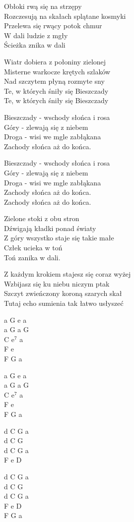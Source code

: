 \begin{text}
    Obłoki rwą się na strzępy\\
    Rozczesują na skałach splątane kosmyki\\
    Przelewa się rwący potok chmur\\
    W dali ludzie z mgły\\
    Ścieżka znika w dali

    Wiatr dobiera z połoniny zielonej\\
    Misterne warkocze krętych szlaków\\
    Nad szczytem płyną rozmyte sny\\
    Te, w których śniły się Bieszczady\\
    Te, w których śniły się Bieszczady

    Bieszczady - wschody słońca i rosa\\
    Góry - zlewają się z niebem\\
    Droga - wisi we mgle zabłąkana\\
    Zachody słońca aż do końca.

    Bieszczady - wschody słońca i rosa\\
    Góry - zlewają się z niebem\\
    Droga - wisi we mgle zabłąkana\\
    Zachody słońca aż do końca.\\
    Zachody słońca aż do końca.

    Zielone stoki z obu stron\\
    Dźwigają kładki ponad światy\\
    Z góry wszystko staje się takie małe\\
    Człek ucieka w toń\\
    Toń zanika w dali.

    Z każdym krokiem stajesz się coraz wyżej\\
    Wzbijasz się ku niebu niczym ptak\\
    Szczyt zwieńczony koroną szarych skał\\
    Tutaj echo sumienia tak łatwo usłyszeć
\end{text}
\begin{chord}
    a G e a\\
    a G a G\\
    C $\mathrm{e^7}$ a\\
    F e\\
    F G a

    a G e a\\
    a G a G\\
    C $\mathrm{e^7}$ a\\
    F e\\
    F G a

    d C G a\\
    d C G\\
    d C G a\\
    F e D

    d C G a\\
    d C G\\
    d C G a\\
    F e D\\
    F G a
\end{chord}
